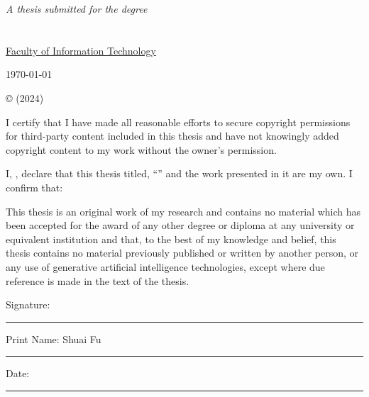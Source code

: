 \documentclass[
11pt, %
english, %
singlespacing, %
headsepline, %
]{MastersDoctoralThesis} %
\begin{document}
\begin{titlepage}
\begin{center}
\vfill

\large \textit{A thesis submitted for the degree  }\\[0.4cm] %
\groupname\\\deptname\\ %
\href{http://abc.com}{Faculty of Information Technology}\\[2cm]
 
\vfill

{\large \today}\\[4cm] %
 
\vfill
\end{center}
\end{titlepage}

\begin{copyright}
	
	© \authorname  (2024)
	
I certify that I have made all reasonable efforts to secure copyright permissions for third-party content included in this thesis and have not knowingly added copyright content to my work without the owner's permission.
	
\end{copyright}


\begin{declaration}
\addchaptertocentry{\authorshipname} %
\noindent I, \authorname, declare that this thesis titled, \enquote{\ttitle} and the work presented in it are my own. I confirm that:

This thesis is an original work of my research and contains no material which has been accepted for the award of any other degree or diploma at any university or equivalent institution and that, to the best of my knowledge and belief, this thesis contains no material previously published or written by another person, or any use of generative artificial intelligence technologies, except where due reference is made in the text of the thesis.

\vspace{1cm}

\noindent Signature:\\
\rule[0.5em]{25em}{0.5pt} %

 \noindent Print Name: Shuai Fu\\
\rule[0.5em]{25em}{0.5pt} %

\noindent Date:\\
\rule[0.5em]{25em}{0.5pt} %
\end{declaration}
\end{document}
